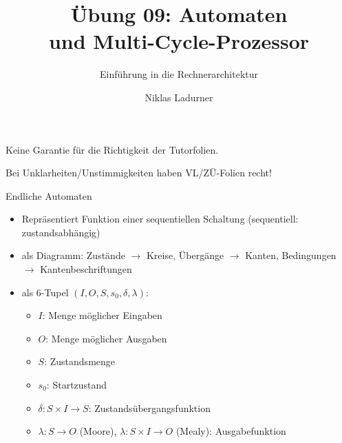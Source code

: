 \documentclass[
  german,            %
  aspectratio=169,    %
]{tumbeamer}
\title{Übung 09: Automaten \\und
	Multi-Cycle-Prozessor}
\subtitle{Einführung in die Rechnerarchitektur}
\author{Niklas Ladurner}
\institute{\theChairName\\\theDepartmentName\\\theUniversityName}
\date{\DTMdisplaydate{2024}{12}{13}{-1}}
\begin{document}
\maketitle

\begin{frame}[c, fragile]{}{}
	\begin{center}
		\LARGE  Keine Garantie für die Richtigkeit der Tutorfolien.

		\Large Bei Unklarheiten/Unstimmigkeiten haben VL/ZÜ-Folien recht!
	\end{center}
\end{frame}

\begin{frame}[fragile, c]{Endliche Automaten}{}
	\begin{itemize}
		\item Repräsentiert Funktion einer sequentiellen Schaltung (sequentiell: zustandsabhängig)
		\item als Diagramm: Zustände $\rightarrow$ Kreise, Übergänge $\rightarrow$ Kanten, Bedingungen $\rightarrow$ Kantenbeschriftungen
		\item als 6-Tupel $(I, O, S, s_0, \delta, \lambda)$:
		      \begin{itemize}
			      \item $I$: Menge möglicher Eingaben
			      \item $O$: Menge möglicher Ausgaben
			      \item $S$: Zustandsmenge
			      \item $s_0$: Startzustand
			      \item $\delta:  S\times I\rightarrow S$: Zustandsübergangsfunktion
			      \item $\lambda: S\rightarrow O$ (Moore), $\lambda: S\times I\rightarrow O$ (Mealy): Ausgabefunktion
		      \end{itemize}
	\end{itemize}
\end{frame}
\end{document}
